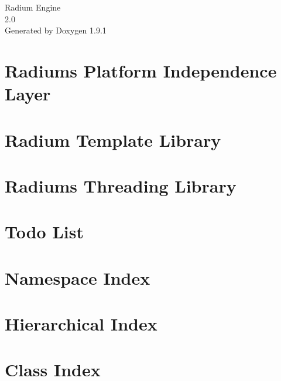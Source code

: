 \let\mypdfximage\pdfximage\def\pdfximage{\immediate\mypdfximage}\documentclass[twoside]{book}
\newcommand{\+}{\discretionary{\mbox{\scriptsize$\hookleftarrow$}}{}{}}
\newcommand{\clearemptydoublepage}{%
  \newpage{\pagestyle{empty}\cleardoublepage}%
}
\begin{document}
\raggedbottom

\hypersetup{pageanchor=false,
             bookmarksnumbered=true,
             pdfencoding=unicode
            }
\begin{titlepage}
\vspace*{7cm}
\begin{center}%
{\Large Radium Engine \\[1ex]\large 2.\+0 }\\
\vspace*{1cm}
{\large Generated by Doxygen 1.9.1}\\
\end{center}
\end{titlepage}
\clearemptydoublepage
{}
\tableofcontents
\clearemptydoublepage
{}
\hypersetup{pageanchor=true}

\chapter{Radium\textquotesingle{}s Platform Independence Layer}
\label{md__doc_platform_independence}

\chapter{Radium Template Library}
\label{md__doc_rtl}

\chapter{Radium\textquotesingle{}s Threading Library}
\label{md__doc_threading}

\chapter{Todo List}
\label{todo}

\chapter{Namespace Index}

\chapter{Hierarchical Index}

\chapter{Class Index}

\end{document}
